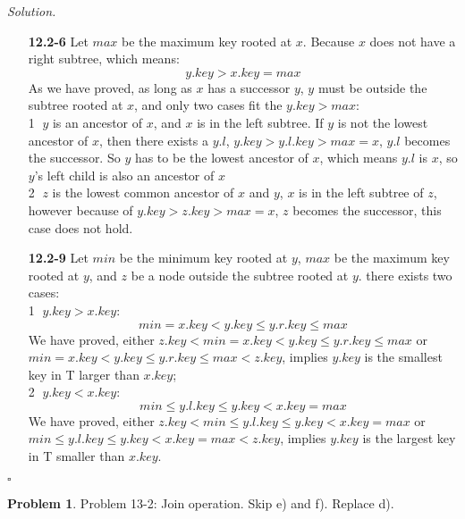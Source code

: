 \documentclass[11pt]{article}
\theoremstyle{definition}
\newtheorem{problem}{Problem}
\newenvironment{solution}{\noindent\emph{Solution.}}{\hfill$\square$}
\newcommand\tab[1][1cm]{\hspace*{#1}}
\begin{document}
\begin{solution}
\begin{enumerate}
    \item[\textbf{12.2-6}]
    \tab Let $max$ be the maximum key rooted at $x$. Because $x$ does not have a right subtree, which means:
    $$y.key > x.key = max$$
   \tab  As we have proved, as long as $x$ has a successor $y$, $y$ must be outside the subtree rooted at $x$, and only two cases fit the $y.key > max$:\\
   \tab \textcircled{1} $y$ is an ancestor of $x$, and $x$ is in the left subtree. If $y$ is not the lowest ancestor of $x$, then there exists a $y.l$, $y.key > y.l.key > max = x$,  $y.l$ becomes the successor. So $y$ has to be the lowest ancestor of $x$, which means $y.l$ is $x$, so $y$'s left child is also an ancestor of $x$\\
   \tab \textcircled{2} $z$ is the lowest common ancestor of $x$ and $y$, $x$ is in the left subtree of $z$, however because of $y.key > z.key > max = x$, $z$ becomes the successor, this case does not hold.
   
   \item[\textbf{12.2-9}]
   \tab Let $min$ be the minimum key rooted at $y$, $max$ be the maximum key rooted at $y$, and $z$ be a node outside the subtree rooted at $y$.
   there exists two cases: \\
   \tab \textcircled{1} $y.key > x.key$:
   $$min = x.key < y.key \leq y.r.key \leq max$$
   \tab We have proved, either $z.key < min = x.key < y.key \leq y.r.key \leq max$ or $min = x.key < y.key \leq y.r.key \leq max < z.key$, implies $y.key$ is the smallest key in T larger than $x.key$;\\
   \tab \textcircled{2} $y.key < x.key$: \\
   $$min \leq y.l.key \leq y.key < x.key = max$$
   \tab We have proved, either $z.key < min \leq y.l.key \leq y.key < x.key = max$ or $min \leq y.l.key \leq y.key < x.key = max < z.key$, implies $y.key$ is the largest key in T smaller than $x.key$.
    
\end{enumerate}

\end{solution}

\newpage



\begin{problem}
Problem 13-2: Join operation. Skip e) and f). Replace d).
\end{problem}
\end{document}
